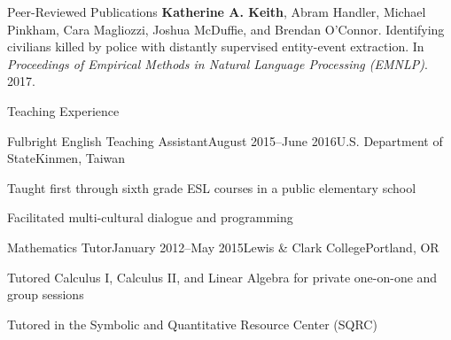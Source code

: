 \documentclass{resume} %
\begin{document}
%
\begin{rSection}{Peer-Reviewed Publications}
\textbf{Katherine A. Keith}, Abram Handler, Michael Pinkham, Cara Magliozzi, Joshua McDuffie, and Brendan O'Connor. Identifying civilians killed by police with distantly supervised entity-event extraction. In \emph{Proceedings of Empirical Methods in Natural Language Processing (EMNLP)}. 2017. 

\end{rSection}


\begin{rSection}{Teaching Experience}

\begin{rSubsection}{Fulbright English Teaching Assistant}{August 2015--June 2016}{U.S. Department of State}{Kinmen, Taiwan}
\item Taught first through sixth grade ESL courses in a public elementary school
\item Facilitated multi-cultural dialogue and programming
\end{rSubsection}

\begin{rSubsection}{Mathematics Tutor}{January 2012--May 2015}{Lewis \& Clark College}{Portland, OR}
\item Tutored Calculus I, Calculus II, and Linear Algebra for private one-on-one and group sessions
\item Tutored in the Symbolic and Quantitative Resource Center (SQRC) 
\end{rSubsection}

\end{rSection}

\end{document}
